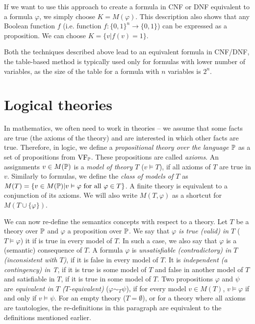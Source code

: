 If we want to use this approach to create a formula in CNF or DNF equivalent to a formula $\varphi$, we simply choose $K=M(\varphi)$. This description also shows that any Boolean function $f$ (i.e. function $f: \{0,1\}^n \to \{0,1\}$) can be expressed as a proposition. We can choose $K = \{v | f(v) = 1\}$. 

Both the techniques described above lead to an equivalent formula in CNF/DNF, the table-based method is typically used only for formulas with lower number of variables, as the size of the table for a formula with $n$ variables is $2^n$.

\section{Logical theories}

In mathematics, we often need to work in theories -- we assume that some facts are true (the axioms of the theory) and are interested in which other facts are true. Therefore, in logic, we define a \emph{propositional theory over the language $\mathbb{P}$} as a set of propositions from $\operatorname{VF}_\mathbb{P}$. These propositions are called \emph{axioms}. An assignments $v \in M(\mathbb{P})$ is a \emph{model of theory $T$} ($v \vDash T$), if all axioms of $T$ are true in $v$. Similarly to formulas, we define the \emph{class of models of $T$} as $M(T) = \{v \in M(\mathbb{P}) | v \vDash \varphi \text{ for all } \varphi \in T\}$. A finite theory is equivalent to a conjunction of its axioms. We will also write $M(T, \varphi)$ as a shortcut for $M(T \cup \{\varphi\})$.

We can now re-define the semantics concepts with respect to a theory. Let $T$ be a theory over $\mathbb{P}$ and $\varphi$ a proposition over $\mathbb{P}$. We say that \emph{$\varphi$ is true (valid) in $T$} ($T\vDash \varphi$) it if is true in every model of $T$. In such a case, we also say that $\varphi$ is a (semantic) consequence of $T$. A formula $\varphi$ is \emph{unsatisfiable (contradictory) in $T$ (inconsistent with $T$)}, if it is false in every model of $T$. It is \emph{independent (a contingency) in T}, if it is true is some model of $T$ and false in another model of $T$ and satisfiable in $T$, if it is true in some model of $T$. Two propositions $\varphi$ and $\psi$ are \emph{equivalent in $T$ ($T$-equivalent)} ($\varphi \sim_T \psi$), if for every model $v \in M(T)$, $v \vDash \varphi$ if and only if $v \vDash \psi$. For an empty theory ($T = \emptyset$), or for a theory where all axioms are tautologies, the re-definitions in this paragraph are equivalent to the definitions mentioned earlier.

